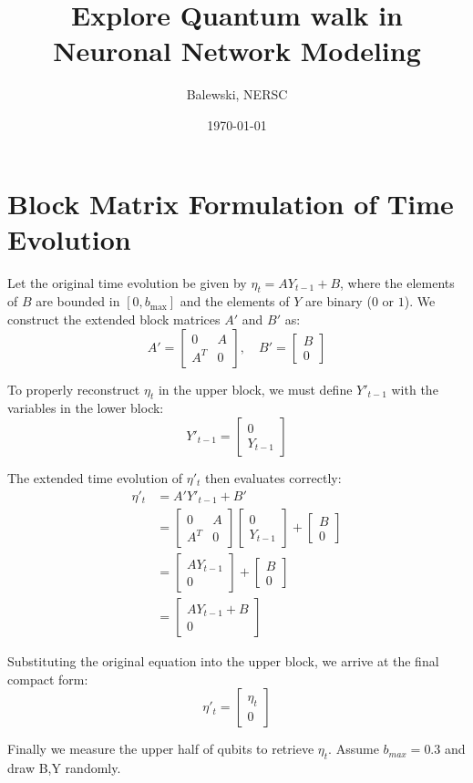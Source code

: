 \documentclass[11pt]{article}
\title{Explore Quantum walk in Neuronal Network Modeling}
\author{Balewski, NERSC}
\date{\today}
\begin{document}
\maketitle

\section{Block Matrix Formulation of Time Evolution}

Let the original time evolution be given by $\eta_t = A Y_{t-1} + B$, where the elements of $B$ are bounded in $[0, b_{\max}]$ and the elements of $Y$ are binary ($0$ or $1$). We construct the extended block matrices $A'$ and $B'$ as:
\begin{equation}
    A' = \begin{bmatrix} 0 & A \\ A^T & 0 \end{bmatrix}, \quad B' = \begin{bmatrix} B \\ 0 \end{bmatrix}
\end{equation}

To properly reconstruct $\eta_t$ in the upper block, we must define $Y'_{t-1}$ with the variables in the lower block:
\begin{equation}
    Y'_{t-1} = \begin{bmatrix} 0 \\ Y_{t-1} \end{bmatrix}
\end{equation}

The extended time evolution of $\eta'_t$ then evaluates correctly:
\begin{align}
    \eta'_t &= A' Y'_{t-1} + B' \nonumber \\
            &= \begin{bmatrix} 0 & A \\ A^T & 0 \end{bmatrix} \begin{bmatrix} 0 \\ Y_{t-1} \end{bmatrix} + \begin{bmatrix} B \\ 0 \end{bmatrix} \nonumber \\
            &= \begin{bmatrix} A Y_{t-1} \\ 0 \end{bmatrix} + \begin{bmatrix} B \\ 0 \end{bmatrix} \nonumber \\
            &= \begin{bmatrix} A Y_{t-1} + B \\ 0 \end{bmatrix}
\end{align}

Substituting the original equation into the upper block, we arrive at the final compact form:
\begin{equation}
    \eta'_t = \begin{bmatrix} \eta_t \\ 0 \end{bmatrix}
\end{equation}

Finally we measure the upper half of qubits to retrieve $\eta_t$. Assume $b_{max}=0.3$ and draw B,Y randomly.
\end{document}
